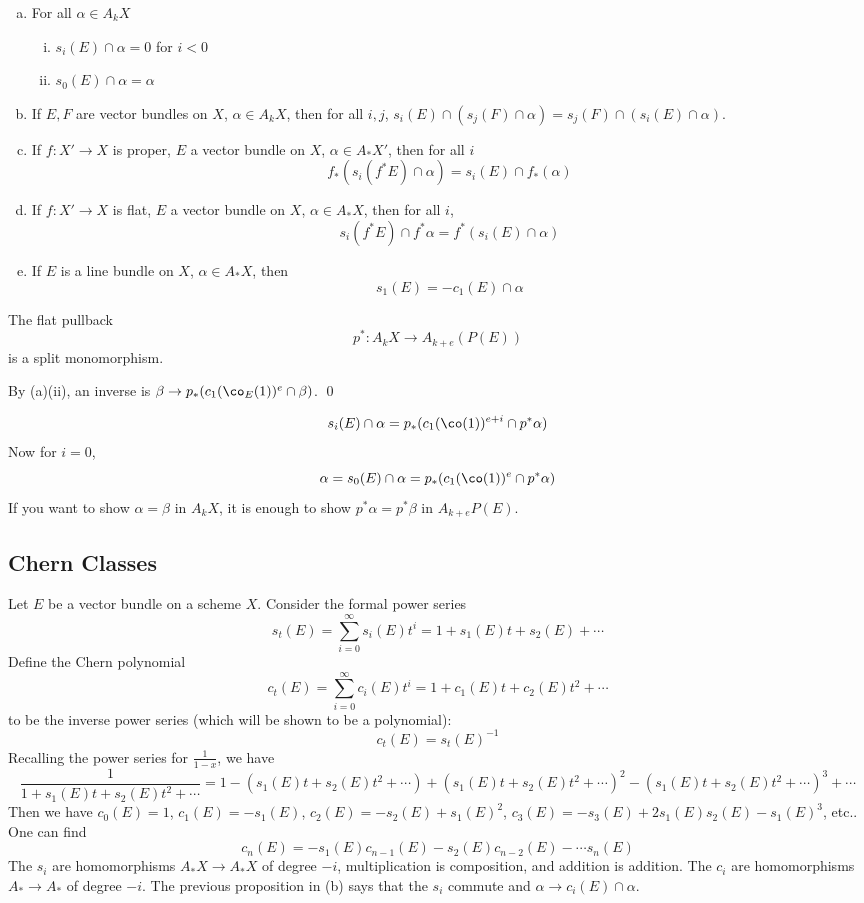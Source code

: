 \begin{prop}
\begin{enumerate}[(a)]
\item For all $\alpha \in A_kX$
	\begin{enumerate}[(i)]
	\item $s_i(E) \cap \alpha=0$ for $i<0$
	\item $s_0(E) \cap \alpha=\alpha$
	\end{enumerate}
\item If $E,F$ are vector bundles on $X$, $\alpha \in A_kX$, then for all $i,j$, $s_i(E) \cap (s_j(F) \cap \alpha)= s_j(F) \cap (s_i(E) \cap \alpha)$.
\item If $f: X' \to X$ is proper, $E$ a vector bundle on $X$, $\alpha \in A_*X'$,  then for all $i$
	\[
	f_*(s_i(f^*E) \cap \alpha)= s_i(E)\cap f_*(\alpha)
	\]
\item If $f: X' \to X$ is flat, $E$ a vector bundle on $X$, $\alpha \in A_*X$, then for all $i$, 
	\[
	s_i(f^*E) \cap f^*\alpha= f^*(s_i(E) \cap \alpha)
	\]
\item If $E$ is a line bundle on $X$, $\alpha \in A_*X$, then	
	\[
	s_1(E)= -c_1(E) \cap \alpha
	\]
\end{enumerate}
\end{prop}

\begin{cor}
The flat pullback 
	\[
	p^*: A_kX \to A_{k+e}(P(E))
	\]
is a split monomorphism.
\end{cor}

\pf By (a)(ii), an inverse is $\beta \to p_*(c_1(\co_E(1))^e \cap \beta)$. \qed

	\[
	s_i(E) \cap \alpha= p_*(c_1(\co(1))^{e+i} \cap p^*\alpha)
	\]
Now for $i=0$,
	\[
	\alpha= s_0(E) \cap \alpha = p_*(c_1(\co(1))^e \cap p^*\alpha)
	\]
If you want to show $\alpha=\beta$ in $A_kX$, it is enough to show $p^*\alpha=p^*\beta$ in $A_{k+e} P(E)$.



\subsection{Chern Classes}

Let $E$ be a vector bundle on a scheme $X$. Consider the formal power series 
	\[
	s_t(E)=\sum_{i=0}^\infty s_i(E) t^i=1+s_1(E)t+s_2(E) + \cdots
	\]
Define the Chern polynomial
	\[
	c_t(E)= \sum_{i=0}^\infty c_i(E) t^i= 1+c_1(E)t+ c_2(E)t^2+ \cdots
	\]
to be the inverse power series (which will be shown to be a polynomial):
	\[
	c_t(E)= s_t(E)^{-1}
	\]
Recalling the power series for $\frac{1}{1-x}$, we have
	\[
	\dfrac{1}{1+s_1(E)t+s_2(E)t^2+\cdots}= 1- (s_1(E)t+s_2(E)t^2+\cdots) + (s_1(E)t+s_2(E)t^2+\cdots)^2 - (s_1(E)t+s_2(E)t^2+\cdots)^3 + \cdots
	\]
Then we have $c_0(E)=1$, $c_1(E)= -s_1(E)$, $c_2(E)= -s_2(E)+s_1(E)^2$, $c_3(E)= -s_3(E)+2s_1(E)s_2(E)-s_1(E)^3$, etc.. One can find
	\[
	c_n(E)= -s_1(E) c_{n-1}(E) - s_2(E)c_{n-2}(E) - \cdots s_n(E)
	\]
The $s_i$ are homomorphisms $A_*X \to A_*X$ of degree $-i$, multiplication is composition, and addition is addition. The $c_i$ are homomorphisms $A_* \to A_*$ of degree $-i$. The previous proposition in (b) says that the $s_i$ commute and $\alpha \to c_i(E) \cap \alpha$. 


